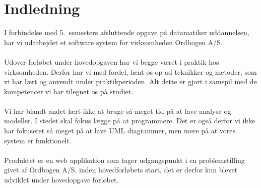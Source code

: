 \section{Indledning}
I forbindelse med 5.\ semesters afsluttende opgave på datamatiker uddannelsen, har vi udarbejdet et software system for virksomheden Ordbogen A/S.
\\\\
Udover forløbet under hovedopgaven har vi begge været i praktik hos virksomheden. Derfor har vi med fordel, lænt os op ad teknikker og metoder,
som vi har lært og anvendt under praktikperioden. Alt dette er gjort i samspil med de kompetencer vi har tilegnet os på studiet.
\\\\
Vi har blandt andet lært ikke at bruge så meget tid på at lave analyse og modeller. I stedet skal fokus lægge på at programmere.
Det er også derfor vi ikke har fokuseret så meget på at lave UML diagrammer, men mere på at vores system er funktionelt.
\\\\
Produktet er en web applikation som tager udgangspunkt i en problemstilling givet af Ordbogen A/S, inden hovedforløbets start, det er derfor kun blevet udviklet under
hovedopgave forløbet.
